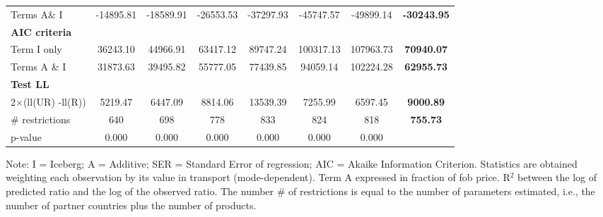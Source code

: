 \documentclass[a4paper,11pt]{article}
\begin{document}
\begin{table}[htbp]
\begin{center}
{\begin{tabular}{lccccccc}
Terms A\& I & \multicolumn{1}{c}{-14895.81} & \multicolumn{1}{c}{-18589.91} & \multicolumn{1}{c}{-26553.53} & \multicolumn{1}{c}{-37297.93} & \multicolumn{1}{c}{-45747.57} & \multicolumn{1}{c}{-49899.14} & \textbf{-30243.95} \\
\textbf{AIC criteria} & \multicolumn{1}{c}{} & \multicolumn{1}{c}{} & \multicolumn{1}{c}{} &       & \multicolumn{1}{c}{} & \multicolumn{1}{c}{} & \textbf{} \\
Term I only & \multicolumn{1}{c}{36243.10} & \multicolumn{1}{c}{44966.91} & \multicolumn{1}{c}{63417.12} & \multicolumn{1}{c}{89747.24} & \multicolumn{1}{c}{100317.13} & \multicolumn{1}{c}{107963.73} & \textbf{70940.07} \\
Terms A \& I & \multicolumn{1}{c}{31873.63} & \multicolumn{1}{c}{39495.82} & \multicolumn{1}{c}{55777.05} & \multicolumn{1}{c}{77439.85} & \multicolumn{1}{c}{94059.14} & \multicolumn{1}{c}{102224.28} & \textbf{62955.73} \\
\textbf{Test LL} &       &       &       &       &       &       & \textbf{} \\
2$\times$(ll(UR) -ll(R)) & \multicolumn{1}{c}{5219.47} & \multicolumn{1}{c}{6447.09} & \multicolumn{1}{c}{8814.06} & \multicolumn{1}{c}{13539.39} & \multicolumn{1}{c}{7255.99} & \multicolumn{1}{c}{6597.45} & \textbf{9000.89} \\
\# restrictions  & \multicolumn{1}{c}{640} & \multicolumn{1}{c}{698} & \multicolumn{1}{c}{778} & \multicolumn{1}{c}{833} & \multicolumn{1}{c}{824} & \multicolumn{1}{c}{818} & \textbf{755.73} \\
p-value & \multicolumn{1}{c}{0.000} & \multicolumn{1}{c}{0.000} & \multicolumn{1}{c}{0.000} & \multicolumn{1}{c}{0.000} & \multicolumn{1}{c}{0.000} & \multicolumn{1}{c}{0.000} & \textbf{} \\
\hline\hline
\end{tabular}}%
\end{center}
 \vspace{-10pt} \tiny{Note: I = Iceberg; A = Additive; SER = Standard Error of regression; AIC = Akaike Information Criterion. Statistics are obtained weighting each observation by its value in transport (mode-dependent). Term A expressed in fraction of fob price. R$^{2}$ between the log of predicted ratio and the log of the observed ratio. The number \# of restrictions is equal to the number of parameters estimated, i.e., the number of partner countries plus the number of products.}
\end{table}%
\end{document}
